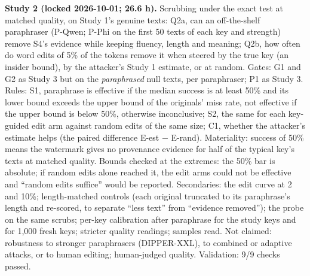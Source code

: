 \documentclass[11pt,letterpaper]{article}
\begin{document}
\textbf{Study 2 (locked 2026-10-01; 26.6 h).} Scrubbing under the exact test at matched quality, on Study 1's genuine texts: Q2a, can an off-the-shelf paraphraser (P-Qwen; P-Phi on the first 50 texts of each key and strength) remove S4's evidence while keeping fluency, length and meaning; Q2b, how often do word edits of 5\% of the tokens remove it when steered by the true key (an insider bound), by the attacker's Study 1 estimate, or at random. Gates: G1 and G2 as Study 3 but on the \emph{paraphrased} null texts, per paraphraser; P1 as Study 3. Rules: S1, paraphrase is effective if the median success is at least 50\% and its lower bound exceeds the upper bound of the originals' miss rate, not effective if the upper bound is below 50\%, otherwise inconclusive; S2, the same for each key-guided edit arm against random edits of the same size; C1, whether the attacker's estimate helps (the paired difference E-est \ensuremath{-} E-rand). Materiality: success of 50\% means the watermark gives no provenance evidence for half of the typical key's texts at matched quality. Bounds checked at the extremes: the 50\% bar is absolute; if random edits alone reached it, the edit arms could not be effective and ``random edits suffice'' would be reported. Secondaries: the edit curve at 2 and 10\%; length-matched controls (each original truncated to its paraphrase's length and re-scored, to separate ``less text'' from ``evidence removed''); the probe on the same scrubs; per-key calibration after paraphrase for the study keys and for 1,000 fresh keys; stricter quality readings; samples read. Not claimed: robustness to stronger paraphrasers (DIPPER-XXL), to combined or adaptive attacks, or to human editing; human-judged quality. Validation: 9/9 checks passed.
\end{document}
